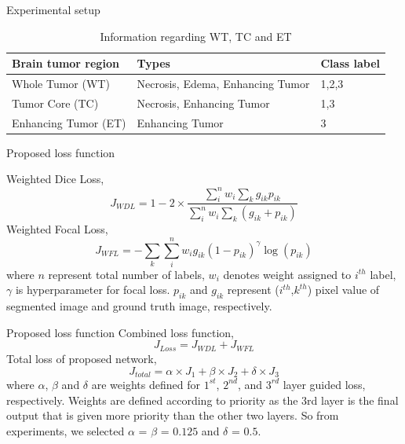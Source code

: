 \documentclass [xcolor=svgnames, t] {beamer}
\begin{document}
\begin{frame}{Experimental setup}
\vspace*{\fill}
\begin{table}[]
\caption{Information regarding WT, TC and ET}
\setlength{\tabcolsep}{2pt}
\begin{tabular}{|l|l|l|}
\hline
Brain tumor region & Types & Class label \\
    \hline
    Whole Tumor (WT) & Necrosis, Edema, Enhancing Tumor & 1,2,3\\
    \hline
    Tumor Core (TC) & Necrosis, Enhancing Tumor & 1,3\\
    \hline
    Enhancing Tumor (ET) & Enhancing Tumor & 3\\
    \hline        
\end{tabular}
\label{tab1}
\end{table}
\vspace*{\fill}
\end{frame}

\begin{frame}{Proposed loss function}

Weighted Dice Loss,
\begin{equation}
J_{WDL} = 1 - 2 \times \frac{\sum_{i}^{n}w_i \sum_{k}g_{ik} p_{ik}}{\sum_{i}^{n}w_i \sum_{k}(g_{ik}+p_{ik})}
\end{equation}
Weighted Focal Loss,
\begin{equation}
J_{WFL} = -\sum_{k}\sum_{i}^{n}w_i g_{ik} (1-p_{ik})^\gamma \log(p_{ik})
\label{eq8}
\end{equation}
where $n$ represent total number of labels, $w_i$ denotes weight assigned to $i^{th}$ label, $\gamma$ is hyperparameter for focal loss. $p_{ik}$ and $g_{ik}$ represent ($i^{th}$,$k^{th}$) pixel value of segmented image and ground truth image, respectively.
\end{frame}

\begin{frame}{Proposed loss function}
Combined loss function,
\begin{equation}
J_{Loss} = J_{WDL} + J_{WFL}
\end{equation}
Total loss of proposed network,
    \begin{equation}
            J_{total} = \alpha \times J_1 + \beta \times J_2 + \delta \times J_3
    \end{equation}
where $\alpha$, $\beta$ and $\delta$ are weights defined for $1^{st}$, $2^{nd}$, and $3^{rd}$ layer guided loss, respectively. Weights are defined according to priority as the 3rd layer is the final output that is given more priority than the other two layers. So from experiments, we selected $\alpha$ = $\beta$ = $0.125$ and $\delta$ = $0.5$.
\end{frame}
\end{document}
